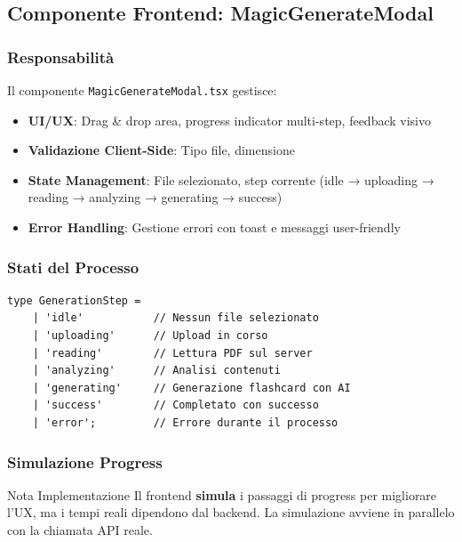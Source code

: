 \documentclass[11pt,a4paper]{article}
\begin{document}
\subsection{Componente Frontend: MagicGenerateModal}

\subsubsection{Responsabilità}

Il componente \texttt{MagicGenerateModal.tsx} gestisce:
\begin{itemize}
    \item \textbf{UI/UX}: Drag \& drop area, progress indicator multi-step, feedback visivo
    \item \textbf{Validazione Client-Side}: Tipo file, dimensione
    \item \textbf{State Management}: File selezionato, step corrente (idle → uploading → reading → analyzing → generating → success)
    \item \textbf{Error Handling}: Gestione errori con toast e messaggi user-friendly
\end{itemize}

\subsubsection{Stati del Processo}

\begin{lstlisting}[caption=Stati Generazione - Frontend]
type GenerationStep = 
    | 'idle'           // Nessun file selezionato
    | 'uploading'      // Upload in corso
    | 'reading'        // Lettura PDF sul server
    | 'analyzing'      // Analisi contenuti
    | 'generating'     // Generazione flashcard con AI
    | 'success'        // Completato con successo
    | 'error';         // Errore durante il processo
\end{lstlisting}

\subsubsection{Simulazione Progress}

\begin{importantbox}{Nota Implementazione}
Il frontend \textbf{simula} i passaggi di progress per migliorare l'UX, ma i tempi reali dipendono dal backend. La simulazione avviene in parallelo con la chiamata API reale.
\end{importantbox}
\end{document}
